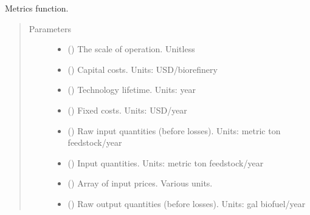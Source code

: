 \documentclass[letterpaper,10pt,english]{sphinxmanual}
\begin{document}
\begin{fulllineitems}
\label{\detokenize{doc-src/technology:technology.biorefinery_v1.metrics}}
Metrics function.
\begin{quote}\begin{description}
\item[{Parameters}] \leavevmode\begin{itemize}
\item {} 
 () \textendash{} The scale of operation. Unitless

\item {} 
 () \textendash{} Capital costs. Units: USD/biorefinery

\item {} 
 () \textendash{} Technology lifetime. Units: year

\item {} 
 () \textendash{} Fixed costs. Units: USD/year

\item {} 
 () \textendash{} Raw input quantities (before losses). Units: metric ton feedstock/year

\item {} 
 () \textendash{} Input quantities. Units: metric ton feedstock/year

\item {} 
 () \textendash{} Array of input prices. Various units.

\item {} 
 () \textendash{} Raw output quantities (before losses). Units: gal biofuel/year


\end{itemize}
\end{description}
\end{quote}
\end{fulllineitems}
\end{document}
